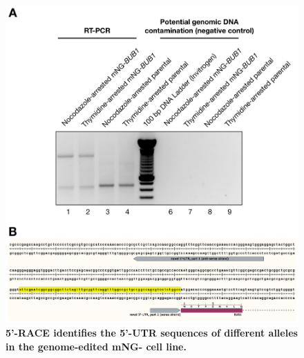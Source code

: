 \begin{figure}
    \centering
    \includegraphics[width=\textwidth]{chapters/figures/5RACE.pdf}
    \caption{\textbf{5'-RACE identifies the 5'-UTR sequences of different  alleles in the genome-edited mNG- cell line.}}
    \label{5RACE}
\end{figure}

